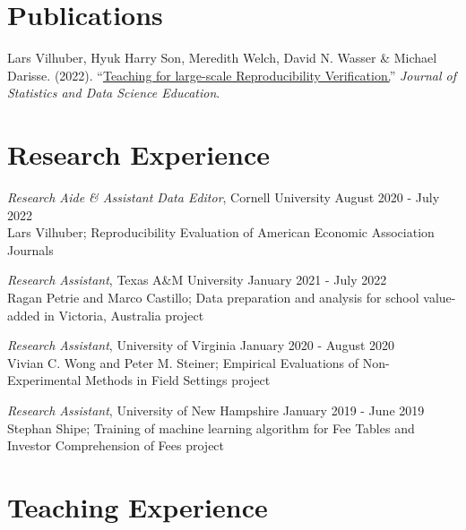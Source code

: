 \documentclass[letterpaper]{article}
\renewenvironment{itemize}{
  \begin{list}{}{
    \setlength{\leftmargin}{1.5em}
  }
}{
  \end{list}
}
\begin{document}
\section*{Publications}

\begin{itemize}
    \item Lars Vilhuber, Hyuk Harry Son, Meredith Welch, David N. Wasser \& Michael Darisse. (2022). ``\href{https://www.tandfonline.com/doi/full/10.1080/26939169.2022.2074582}{Teaching for large-scale Reproducibility Verification.}'' \textit{Journal of Statistics and Data Science Education}.
\end{itemize}

\section*{Research Experience}

\begin{itemize}
    \item \textit{Research Aide \& Assistant Data Editor}, Cornell University \hfill August 2020 - July 2022 \\
    Lars Vilhuber; Reproducibility Evaluation of American Economic Association Journals 

    \item \textit{Research Assistant}, Texas A\&M University \hfill January 2021 - July 2022 \\
    Ragan Petrie and Marco Castillo;  Data preparation and analysis for school value-added in Victoria, Australia project

    \item \textit{Research Assistant}, University of Virginia \hfill January 2020 - August 2020 \\
    Vivian C. Wong and Peter M. Steiner; Empirical Evaluations of Non-Experimental Methods in Field Settings project

    \item \textit{Research Assistant}, University of New Hampshire \hfill January 2019 - June 2019 \\
    Stephan Shipe; Training of machine learning algorithm for Fee Tables and Investor Comprehension of Fees project

\end{itemize}

\section*{Teaching Experience}
\end{document}
